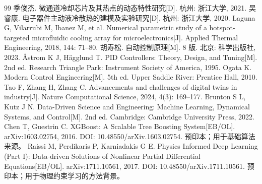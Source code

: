 \documentclass[UTF8]{midterm}
\begin{document}
\begin{thebibliography}{99}
 季俊杰. 微通道冷却芯片及其热点的动态特性研究[D]. 杭州: 浙江大学, 2021.
 吴睿康. 电子器件主动液冷散热的建模及实验研究[D]. 杭州: 浙江大学, 2020.
 Laguna G, Vilarrubi M, Ibanez M, et al. Numerical parametric study of a hotspot-targeted microfluidic cooling array for microelectronics[J]. Applied Thermal Engineering, 2018, 144: 71--80.
 胡寿松. 自动控制原理[M]. 8 版. 北京: 科学出版社, 2023.
 {\AA}strom K J, H{\"a}gglund T. PID Controllers: Theory, Design, and Tuning[M]. 2nd ed. Research Triangle Park: Instrument Society of America, 1995.
 Ogata K. Modern Control Engineering[M]. 5th ed. Upper Saddle River: Prentice Hall, 2010.
 Tao F, Zhang H, Zhang C. Advancements and challenges of digital twins in industry[J]. Nature Computational Science, 2024, 4(3): 169--177.
 Brunton S L, Kutz J N. Data-Driven Science and Engineering: Machine Learning, Dynamical Systems, and Control[M]. 2nd ed. Cambridge: Cambridge University Press, 2022.
 Chen T, Guestrin C. XGBoost: A Scalable Tree Boosting System[EB/OL]. arXiv:1603.02754, 2016. DOI: 10.48550/arXiv.1603.02754. 预印本；用于基础算法来源。
 Raissi M, Perdikaris P, Karniadakis G E. Physics Informed Deep Learning (Part I): Data-driven Solutions of Nonlinear Partial Differential Equations[EB/OL]. arXiv:1711.10561, 2017. DOI: 10.48550/arXiv.1711.10561. 预印本；用于物理约束学习的方法背景。
\end{thebibliography}
\end{document}

